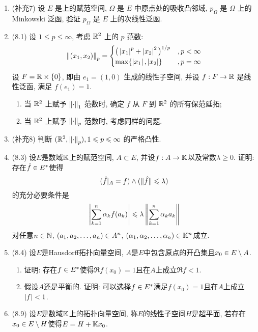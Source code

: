 	\begin{enumerate}[label=\textbf{\arabic*.}, ref=\arabic*]
		\item (补充7) 设 $ E $ 是\R 上的赋范空间, $ \varOmega $ 是 $ E $ 中原点处的吸收凸邻域, $ p_{\varOmega} $ 是 $ \varOmega $ 上的 Minkowski 泛函, 验证 $ p_{\varOmega} $ 是 $ E $ 上的次线性泛函.
		\item (8.1) 设 $ 1\leqslant p\leqslant\infty $, 考虑 $ \mathbb{R}^{2} $ 上的 $ p $ 范数:
			\[
				\left\| (x_{1}, x_{2}) \right\|_{p}=
				\begin{cases}
					\big( \left| x_{1} \right| ^{p}+\left| x_{2} \right| ^{2} \big)^{1/p} & ,p<\infty\\
					\max\{\left| x_{1} \right| , \left| x_{2} \right| \} & ,p = \infty
				\end{cases}
			\]
			设 $ F=\mathbb{R}\times\{ 0 \} $, 即由 $ e_{1}=(1, 0) $ 生成的线性子空间, 并设 $ f:F\to\mathbb{R} $ 是线性泛函, 满足 $ f(e_{1})=1 $.
			\begin{enumerate}[(1)]
				\item 当 $ \mathbb{R}^{2} $ 上赋予 $ \left\| \cdot \right\|_{1} $ 范数时, 确定 $ f $ 从 $ F $ 到 $ \mathbb{R}^{2} $ 的所有保范延拓;
				\item 当 $ \mathbb{R}^{2} $ 上赋予 $ \left\| \cdot \right\|_{p} $ 范数时, 考虑同样的问题.
			\end{enumerate}
		\item (补充8) 判断 $ (\mathbb{R}^{2}, \left\| \cdot \right\|_{p}), 1\leqslant p\leqslant\infty $ 的严格凸性.
		\item (8.3) 设$ E $是数域$ \mathbb{K} $上的赋范空间, $ A\subset E $, 并设$ f : A\to\mathbb{K} $以及常数$ \lambda\geqslant 0 $. 证明: 存在$ \hat{f}\in E^{*} $使得
			\[
			(\hat{f}\rvert_A=f)\land (\lVert \hat{f}\rVert\leqslant\lambda)
			\]
			的充分必要条件是
			\[
			\left| \sum_{k=1}^n\alpha_kf(a_k) \right| \leqslant\lambda\left\| \sum_{k=1}^n\alpha_ka_k \right\|
			\]
			对任意$ n\in\mathbb{N} $, $ (a_{1}, a_{2}, \dots, a_{n})\in A^n $, $ (\alpha_{1}, \alpha_{2}, \dots, \alpha_{n})\in\mathbb{K}^n $成立.
		\item (8.4) 设$ E $是Hausdorff拓扑向量空间, $ A $是$ E $中包含原点的开凸集且$ x_0\in E\setminus A $.
			\begin{enumerate}[(1)]
			\item 证明: 存在$ f\in E^{*} $使得$ \Re f(x_0)=1 $且在$ A $上成立$ \Re f<1 $.
			\item 假设$ A $还是平衡的. 证明: 可以选择$ f\in E^{*} $满足$ f(x_0)=1 $且在$ A $上成立$ \left| f \right| <1 $.
			\end{enumerate}
		\item (8.9) 设$ E $是数域$ \mathbb{K} $上的拓扑向量空间, 称$ E $的线性子空间$ H $是超平面, 若存在$ x_0\in E\setminus H $使得$ E=H+\mathbb{K} x_0 $.
			\begin{enumerate}[(1)]

\end{enumerate}
\end{enumerate}
